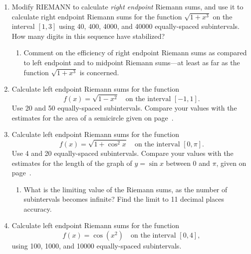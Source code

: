 \begin{enumerate}
\begin{enumerate}
  \item Comment on the relative ``efficiency'' of midpoint Riemann sums versus left endpoint Riemann sums (at least for the function $\sqrt{1 + x^3}$ on the interval $[1, 3]$).  To get the same level of accuracy, an {\em efficient\/} calculation will take fewer steps than an {\em inefficient\/} one.


\end{enumerate}
\item Modify RIEMANN to calculate {\em right endpoint\/} Riemann sums, and use it to calculate right endpoint Riemann sums for the function $\sqrt{1 + x^3}$ on the interval
$[1, 3]$ using 40, 400, 4000, and 40000 equally-spaced subintervals.  How many digits in this sequence have stabilized?

  \begin{enumerate}
  \item Comment on the efficiency of right endpoint Riemann sums as compared to left endpoint and to midpoint Riemann sums---at least as far as the function $\sqrt{1 +x^3}$ is concerned.


\end{enumerate}
\item Calculate left endpoint Riemann sums for the function
	\[
f(x) = \sqrt{1 - x^2} \quad 
		\mbox{on the interval $[-1, 1]$}.
\]
Use 20 and 50 equally-spaced subintervals.  Compare your values with the estimates for the area of a semicircle given on page~\pageref{semicir}.


\item Calculate left endpoint Riemann sums for the function
	\[
f(x) = \sqrt{1 + \cos^2{x}} \quad 
		\mbox{on the interval $[0, \pi]$}.
\]
Use 4 and 20 equally-spaced subintervals.  Compare your values with
the estimates for the length of the graph of $y = \sin{x}$ between 0
and $\pi$, given on page~\pageref{length}.

  \begin{enumerate}
  \item What is the limiting value of the Riemann sums, as the number of
subintervals becomes infinite?  Find the limit to 11 decimal places
accuracy.


\end{enumerate}
\item Calculate left endpoint Riemann sums for the function
	\[
f(x) = \cos(x^2) \quad 
		\mbox{on the interval $[0, 4]$},
\]
using 100, 1000, and 10000 equally-spaced subintervals.  




\end{enumerate}
